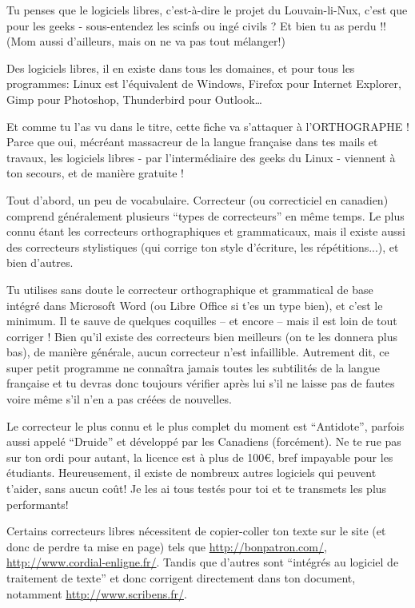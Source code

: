 \documentclass[12pt]{../fiche}
\begin{document}


Tu penses que le logiciels libres, c'est-à-dire le projet du Louvain-li-Nux, c'est que pour les geeks - sous-entendez les scinfs ou ingé civils ? Et bien tu as perdu !! (Mom aussi d'ailleurs, mais on ne va pas tout mélanger!)

Des logiciels libres, il en existe dans tous les domaines, et pour tous les programmes: Linux est l'équivalent de Windows, Firefox pour Internet Explorer, Gimp pour Photoshop, Thunderbird pour Outlook…

Et comme tu l'as vu dans le titre, cette fiche va s'attaquer à l'ORTHOGRAPHE ! Parce que oui, mécréant massacreur de la langue française dans tes mails et travaux, les logiciels libres - par l'intermédiaire des geeks du Linux - viennent à ton secours, et de manière gratuite !

Tout d'abord, un peu de vocabulaire. Correcteur (ou correcticiel en canadien) comprend généralement plusieurs ``types de correcteurs'' en même temps. Le plus connu étant les correcteurs orthographiques et grammaticaux, mais il existe aussi des correcteurs stylistiques (qui corrige ton style d'écriture, les répétitions...), et bien d'autres.

Tu utilises sans doute le correcteur orthographique et grammatical de base intégré dans Microsoft Word (ou Libre Office si t'es un type bien), et c'est le minimum. Il te sauve de quelques coquilles – et encore – mais il est loin de tout corriger ! Bien qu'il existe des correcteurs bien meilleurs (on te les donnera plus bas), de manière générale, aucun correcteur n'est infaillible. Autrement dit, ce super petit programme ne connaîtra jamais toutes les subtilités de la langue française et tu devras donc toujours vérifier après lui s'il ne laisse pas de fautes voire même s'il n'en a pas créées de nouvelles.

Le correcteur le plus connu et le plus complet du moment est ``Antidote'', parfois aussi appelé ``Druide'' et développé par les Canadiens (forcément). Ne te rue pas sur ton ordi pour autant, la licence est à plus de \si{100}{\euro}, bref impayable pour les étudiants. Heureusement, il existe de nombreux autres logiciels qui peuvent t'aider, sans aucun coût! Je les ai tous testés pour toi et te transmets les plus performants!

Certains correcteurs libres nécessitent de copier-coller ton texte sur le site (et donc de perdre ta mise en page) tels que \url{http://bonpatron.com/}, \url{http://www.cordial-enligne.fr/}.
Tandis que d'autres sont ``intégrés au logiciel de traitement de texte'' et donc corrigent directement dans ton document, notamment \url{http://www.scribens.fr/}.
\end{document}
